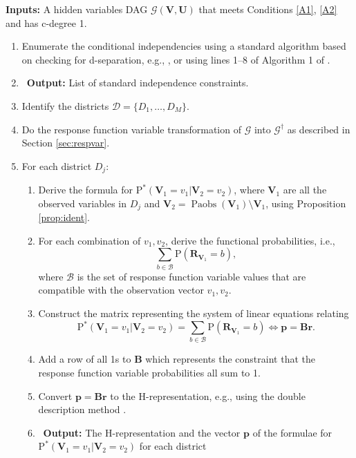 \documentclass[12pt]{article}
\def\Pr{{\mathrm{P}}}
\def\Pdo{{\mathrm{P}^*}}
\DeclareMathOperator{\Paobs}{Paobs}
\newcommand{\bU}{\boldsymbol{U}}
\newcommand{\bV}{\boldsymbol{V}}
\begin{document}
\textbf{Inputs: } A hidden variables DAG $\mathcal{G}(\bV, \bU)$ that meets Conditions \ref{A1}, \ref{A2} and has c-degree 1. 
\begin{enumerate}
    \item Enumerate the conditional independencies using a standard algorithm based on checking for d-separation, e.g., \citet{van2014constructing}, or using lines 1--8 of Algorithm 1 of \citet{richardson2023nested}.
    \item[] \, \textbf{Output: } List of standard independence constraints.  
    \item Identify the districts $\mathcal{D} = \{D_1, \ldots, D_M\}$. 
    \item Do the response function variable transformation of $\mathcal{G}$ into $\mathcal{G}^\dagger$ as described in Section \ref{sec:respvar}.
    \item For each district $D_j$: 
   \begin{enumerate}  
        \item Derive the formula for $\Pdo(\bV_1 = v_1 | \bV_2 = v_2)$, where $\bV_1$ are all the observed variables in $D_j$ and $\bV_2 = \Paobs(\bV_1) \setminus \bV_1$, using Proposition \ref{prop:ident}.
        \item For each combination of $v_1, v_2$, derive the functional probabilities, i.e., 
        \[
        \sum_{b \in \mathcal{B}} \Pr(\boldsymbol{R}_{\bV_1} = b), 
        \]
    where $\mathcal{B}$ is the set of response function variable values that are compatible with the observation vector $v_1, v_2$. 
    \item Construct the matrix representing the system of linear equations relating 
    \[
    \Pdo(\bV_1 = v_1 |\bV_2 = v_2) = \sum_{b \in \mathcal{B}} \Pr(\boldsymbol{R}_{\bV_1} = b) \Leftrightarrow \boldsymbol{p} = \boldsymbol{B} \boldsymbol{r}.
    \]
    \item Add a row of all 1s to $\boldsymbol{B}$ which represents the constraint that the response function variable probabilities all sum to 1. 
    \item Convert $\boldsymbol{p} = \boldsymbol{B} \boldsymbol{r}$ to the H-representation, e.g., using the double description method \citep{cdd, doubledescriptionmethod}.
    \item[] \, \textbf{Output: } The H-representation and the vector $\boldsymbol{p}$ of the formulae for $\Pdo(\bV_1 = v_1 |\bV_2 = v_2)$ for each district
    \end{enumerate}
\end{enumerate}
\end{document}
